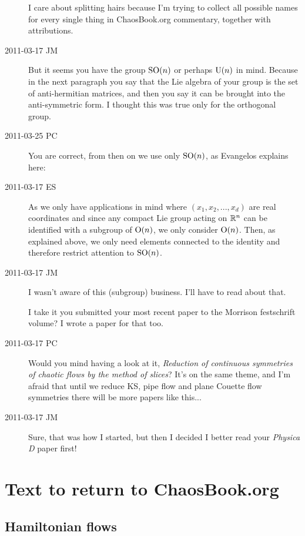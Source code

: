 \begin{description}
I care about splitting hairs because I'm trying to collect all possible
names for every single thing in ChaosBook.org commentary, together with
attributions.

\item[2011-03-17 JM]
But it seems you have the group $\textrm{SO}(n)$ or perhaps
$\textrm{U}(n)$ in mind. Because in the next paragraph
you say that the Lie algebra of your group is the set
of anti-hermitian matrices, and then you say it can be
brought into the anti-symmetric form. I thought this was
true only for the orthogonal group.

\item[2011-03-25 PC]
You are correct, from then on we use only  $\textrm{SO}(n)$, as Evangelos
explains here:

\item[2011-03-17 ES]
As we only have applications in mind where $(x_1,x_2,...,x_d)$ are real
coordinates and since any compact Lie group acting on $\mathbb{R}^n$ can be
identified with a subgroup of $\textrm{O}(n)$, we only consider $\textrm{O}(n)$. Then, as
explained above, we only need elements connected to the identity and
therefore restrict attention to $\textrm{SO}(n)$.

\item[2011-03-17 JM]
I wasn't aware of this (subgroup) business. I'll have to read about that.

I take it you submitted your most recent paper to the Morrison
festschrift volume? I wrote a paper for that too.

\item[2011-03-17 PC]
Would you mind having a look at it,
{\emph{Reduction of continuous symmetries}} \emph{of chaotic flows by the
method of slices}? It's on the same theme, and I'm afraid that until we
reduce KS, pipe flow and plane Couette flow symmetries there will be more
papers like this...

\item[2011-03-17 JM]
Sure, that was how I started, but then I decided I better read
your \emph{Physica D} paper first!

\end{description}


\section{Text to return to ChaosBook.org}
\label{sect:toCB}

\subsection{Hamiltonian flows}
\label{sect:HamFlows}


